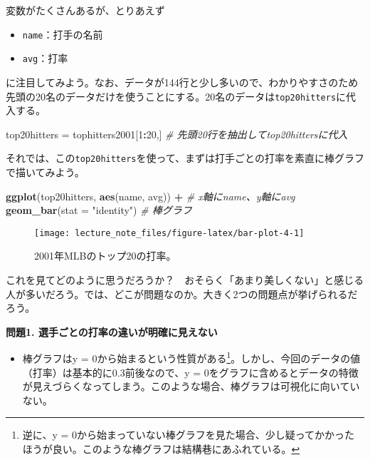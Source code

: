 \documentclass[]{book}
\newenvironment{Shaded}{\begin{snugshade}}{\end{snugshade}}
\newcommand{\KeywordTok}[1]{\textcolor[rgb]{0.13,0.29,0.53}{\textbf{#1}}}
\newcommand{\DataTypeTok}[1]{\textcolor[rgb]{0.13,0.29,0.53}{#1}}
\newcommand{\DecValTok}[1]{\textcolor[rgb]{0.00,0.00,0.81}{#1}}
\newcommand{\StringTok}[1]{\textcolor[rgb]{0.31,0.60,0.02}{#1}}
\newcommand{\CommentTok}[1]{\textcolor[rgb]{0.56,0.35,0.01}{\textit{#1}}}
\newcommand{\OperatorTok}[1]{\textcolor[rgb]{0.81,0.36,0.00}{\textbf{#1}}}
\newcommand{\NormalTok}[1]{#1}
\providecommand{\tightlist}{%
  \setlength{\itemsep}{0pt}\setlength{\parskip}{0pt}}
\let\rmarkdownfootnote\footnote%
\def\footnote{\protect\rmarkdownfootnote}
\begin{document}
変数がたくさんあるが、とりあえず

\begin{itemize}
\item
  \texttt{name}：打手の名前
\item
  \texttt{avg}：打率
\end{itemize}

に注目してみよう。なお、データが144行と少し多いので、わかりやすさのため先頭の20名のデータだけを使うことにする。20名のデータは\texttt{top20hitters}に代入する。

\begin{Shaded}
\begin{Highlighting}[]
\NormalTok{top20hitters =}\StringTok{ }\NormalTok{tophitters2001[}\DecValTok{1}\OperatorTok{:}\DecValTok{20}\NormalTok{,] }\CommentTok{# 先頭20行を抽出してtop20hittersに代入}
\end{Highlighting}
\end{Shaded}

それでは、この\texttt{top20hitters}を使って、まずは打手ごとの打率を素直に棒グラフで描いてみよう。



\begin{Shaded}
\begin{Highlighting}[]
\KeywordTok{ggplot}\NormalTok{(top20hitters, }\KeywordTok{aes}\NormalTok{(name, avg)) }\OperatorTok{+}\StringTok{ }\CommentTok{# x軸にname、y軸にavg}
\StringTok{  }\KeywordTok{geom_bar}\NormalTok{(}\DataTypeTok{stat =} \StringTok{"identity"}\NormalTok{) }\CommentTok{# 棒グラフ}
\end{Highlighting}
\end{Shaded}

\begin{figure}

{\centering \texttt{[image: lecture\_note\_files/figure-latex/bar-plot-4-1]} 

}

\caption{2001年MLBのトップ20の打率。}\label{fig:bar-plot-4}
\end{figure}

これを見てどのように思うだろうか？　おそらく「あまり美しくない」と感じる人が多いだろう。では、どこが問題なのか。大きく2つの問題点が挙げられるだろう。

\textbf{問題1. 選手ごとの打率の違いが明確に見えない}

\begin{itemize}
\tightlist
\item
  棒グラフはy = 0から始まるという性質がある\footnote{逆に、y =
    0から始まっていない棒グラフを見た場合、少し疑ってかかったほうが良い。このような棒グラフは結構巷にあふれている。}。しかし、今回のデータの値（打率）は基本的に0.3前後なので、y
  =
  0をグラフに含めるとデータの特徴が見えづらくなってしまう。このような場合、棒グラフは可視化に向いていない。
\end{itemize}
\end{document}
